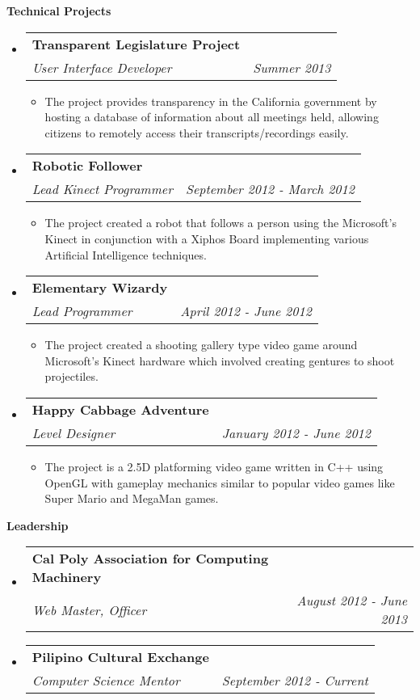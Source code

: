 \documentclass[letterpaper,11pt]{article}
\makeatletter
\newcommand{\resitem}[1]{\item #1 \vspace{-2pt}}
\newcommand{\resheading}[1]{{\large \colorbox{bggray}{\begin{minipage}{\textwidth}{\textbf{#1 \vphantom{p\^{E}}}}\end{minipage}}}}
\newcommand{\ressubheading}[4]{
   \begin{tabular*}{7.0in}{l@{\extracolsep{\fill}}r}
         \textbf{#1} & #2 \\
         \textit{#3} & \textit{#4} \\
   \end{tabular*}\vspace{-6pt}}
\makeatother
\begin{document}
\resheading{Technical Projects}

\begin{itemize}
\item
   \ressubheading{Transparent Legislature Project}{}{User Interface Developer}{Summer 2013}
   \begin{itemize}
      \resitem{The project provides transparency in the California government by hosting a database of information about all meetings held, allowing citizens to remotely access their transcripts/recordings easily.}
   \end{itemize}
\item
   \ressubheading{Robotic Follower}{}{Lead Kinect Programmer}{September 2012 - March 2012}
   \begin{itemize}
      \resitem{The project created a robot that follows a person using the Microsoft's Kinect in conjunction with a Xiphos Board implementing various Artificial Intelligence techniques.}
   \end{itemize}
\item
   \ressubheading{Elementary Wizardy }{}{Lead Programmer}{April 2012 - June 2012}
      \begin{itemize}
         \resitem{The project created a shooting gallery type video game around Microsoft's Kinect hardware which involved creating gentures to shoot projectiles.}
   \end{itemize}
\item   
  \ressubheading{Happy Cabbage Adventure}{}{Level Designer}{January 2012 - June 2012}
   \begin{itemize}
      \resitem{The project is a 2.5D platforming video game written in C++ using OpenGL with gameplay mechanics similar to popular video games like Super Mario and MegaMan games.}
   \end{itemize}

\end{itemize}

\resheading{Leadership}

\begin{itemize}
\item
   \ressubheading{Cal Poly Association for Computing Machinery}{}{Web Master, Officer}{August 2012 - June 2013}
\item
   \ressubheading{Pilipino Cultural Exchange}{}{Computer Science Mentor}{September  2012 - Current}
\end{itemize}


\vspace{0.15in}
\end{document}
